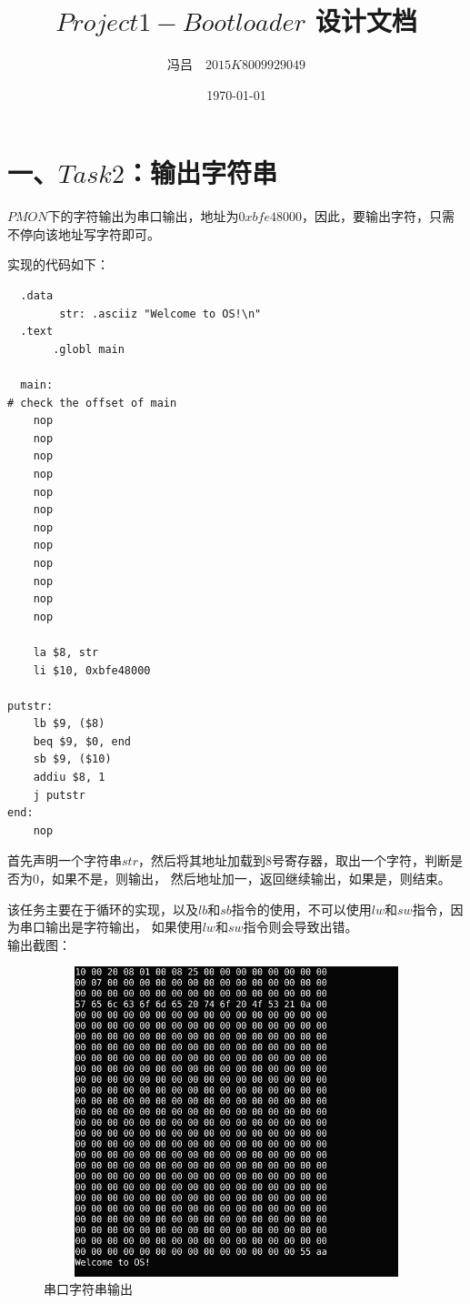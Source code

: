 \documentclass[UTF8,noindent]{ctexart}
\title{$Project1-Bootloader$ 设计文档}
\author{冯吕$\quad 2015K8009929049$}
\date{\today}
\begin{document}
\maketitle
{}

\section*{一、$Task2$：输出字符串}

$PMON $下的字符输出为串口输出，地址为$ 0xbfe48000$，因此，要输出字符，只需不停向该地址写字符即可。

实现的代码如下：
\begin{lstlisting}
  .data
        str: .asciiz "Welcome to OS!\n"
  .text
       .globl main

  main:
# check the offset of main
	nop
	nop
	nop
	nop
	nop
	nop
	nop
	nop
	nop
	nop
	nop
	nop

	la $8, str
	li $10, 0xbfe48000

putstr:
	lb $9, ($8)
	beq $9, $0, end
	sb $9, ($10)
	addiu $8, 1
	j putstr
end:
	nop
\end{lstlisting}

首先声明一个字符串$str$，然后将其地址加载到$8$号寄存器，取出一个字符，判断是否为$0$，如果不是，则输出，
然后地址加一，返回继续输出，如果是，则结束。

该任务主要在于循环的实现，以及$lb$和$sb$指令的使用，不可以使用$lw$和$sw$指令，因为串口输出是字符输出，
如果使用$lw$和$sw$指令则会导致出错。\\

输出截图：
\begin{figure}[H]
	\centering\includegraphics[height = 9cm, width = 
	13cm]{fig/2.png}\caption{串口字符串输出}
\end{figure}
\end{document}
